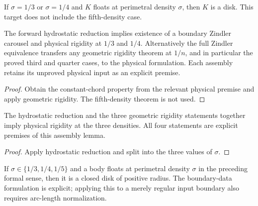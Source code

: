 \begin{theorem}
\label{thm:physical-third-quarter}
If $\sigma=1/3$ or $\sigma=1/4$ and $K$ floats at perimetral density
$\sigma$, then $K$ is a disk. This target does not include the fifth-density case.
\end{theorem}

\begin{lemma}
\label{lem:zindler-physical-assembly}
\leanok
{}
The forward hydrostatic reduction implies existence of a boundary Zindler
carousel and physical rigidity at $1/3$ and $1/4$. Alternatively the full
Zindler equivalence transfers any geometric rigidity theorem at $1/n$,
and in particular the proved third and quarter cases, to the physical formulation.
Each assembly retains its unproved physical input as an explicit premise.
\end{lemma}
\begin{proof}
\leanok
Obtain the constant-chord property from the relevant physical premise and
apply geometric rigidity. The fifth-density theorem is not used.
\end{proof}

\begin{lemma}
\label{lem:physical-assembly}
\leanok
{}
The hydrostatic reduction and the three geometric rigidity statements
together imply physical rigidity at the three densities. All four
statements are explicit premises of this assembly lemma.
\end{lemma}
\begin{proof}
\leanok
Apply hydrostatic reduction and split into the three values of $\sigma$.
\end{proof}

\begin{theorem}
\label{thm:physical-rigidity}
If $\sigma\in\{1/3,1/4,1/5\}$ and a body floats at perimetral density
$\sigma$ in the preceding formal sense, then it is a closed disk of
positive radius. The boundary-data formulation is explicit; applying this
to a merely regular input boundary also requires arc-length normalization.
\end{theorem}

